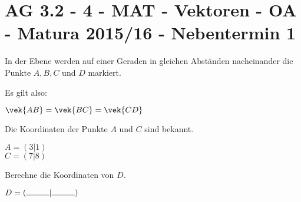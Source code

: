 \section{AG 3.2 - 4 - MAT - Vektoren - OA - Matura 2015/16
- Nebentermin 1}

\begin{beispiel}[AG 3.2]{1} %
In der Ebene werden auf einer Geraden in gleichen Abständen nacheinander die Punkte $A,B,C$ und $D$ markiert. \leer

Es gilt also:

$\vek{AB}=\vek{BC}=\vek{CD}$ \leer

Die Koordinaten der Punkte $A$ und $C$ sind bekannt. \leer

$A=(3|1)$ \\
$C=(7|8)$ \leer

Berechne die Koordinaten von $D$.\leer

$D=(\rule{1cm}{0.3pt}|\rule{1cm}{0.3pt})$

\end{beispiel}